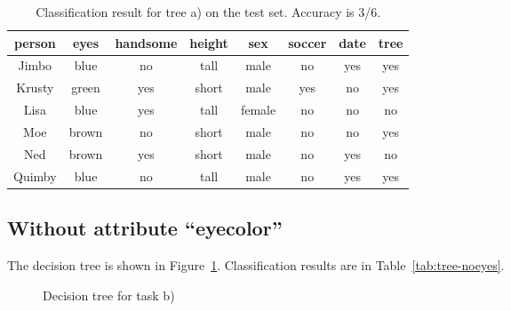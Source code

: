 \begin{table}[h!]
  \centering
  \begin{tabular}{cccccc|c|c}
    \toprule
    person      & eyes  & handsome & height & sex    & soccer & date & tree\\
    \midrule
    Jimbo       & blue  & no       & tall   & male   & no     & yes & yes\\
    Krusty      & green & yes      & short  & male   & yes    & no  & yes\\
    Lisa        & blue  & yes      & tall   & female & no     & no  & no\\
    Moe         & brown & no       & short  & male   & no     & no  & yes\\
    Ned         & brown & yes      & short  & male   & no     & yes & no\\
    Quimby      & blue  & no       & tall   & male   & no     & yes & yes\\
    \bottomrule
  \end{tabular}
  \caption{Classification result for tree a) on the test set. Accuracy is 3/6.}
\label{tab:tree-nosoccer}
\end{table}


\subsection{Without attribute ``eyecolor''}

The decision tree is shown in Figure~\ref{fig:tree-noeyes}.
Classification results are in Table~\ref{tab:tree-noeyes}.

\begin{figure}
\centering 
{}
\caption{Decision tree for task b)}
\label{fig:tree-noeyes}
\end{figure}


